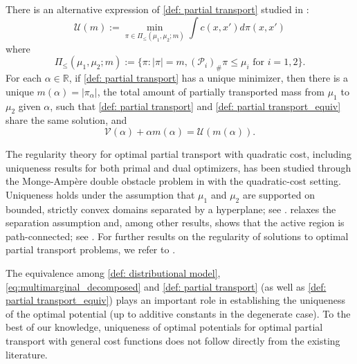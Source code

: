 \documentclass{amsart}
\theoremstyle{plain}
\numberwithin{equation}{section}\newtheorem{theorem}{Theorem}[section]
\theoremstyle{remark}
\begin{document}
There is an alternative expression of \eqref{def: partial transport} studied in \cite{CM2010Annalsmath, Figalli2010ARMA, DynamicPOT2016}:
\begin{equation}\label{def: partial transport_equiv}
    \mathcal{U}(m) :=\min_{\pi\in\Pi_\leq(\mu_1, \mu_2;m)}  \int c(x,x')  d\pi(x,x')
\end{equation}       
where
\[
    \Pi_\leq(\mu_1, \mu_2;m):= \{ \pi : |\pi| = m, (\mathcal{P}_i)_\# \pi \leq \mu_i \text{ for } i=1,2 \}.
\]
For each $\alpha \in \mathbb{R}$, if \eqref{def: partial transport} has a unique minimizer, then there is a unique $m(\alpha)=|\pi_\alpha|$, the total amount of partially transported mass from $\mu_1$ to $\mu_2$ given $\alpha$, such that \eqref{def: partial transport} and \eqref{def: partial transport_equiv} share the same solution, and
\begin{equation}\label{eq: equivalence of partial transport}
    \mathcal{V}(\alpha) + \alpha m(\alpha)= \mathcal{U}(m(\alpha)).
\end{equation}



The regularity theory for optimal partial transport with quadratic cost, including uniqueness results for both primal and dual optimizers, has been studied through the Monge-Ampère double obstacle problem in \cite{CM2010Annalsmath} with the quadratic-cost setting. Uniqueness holds under the assumption that $\mu_1$ and $\mu_2$ are supported on bounded, strictly convex domains separated by a hyperplane; see \cite[Corollary 6.4]{CM2010Annalsmath}. \citet{Figalli2010ARMA} relaxes the separation assumption and, among other results, shows that the active region is path-connected; see \cite[Corollary 4.12]{Figalli2010ARMA}. For further results on the regularity of solutions to optimal partial transport problems, we refer to \cite{FreePOT_Indrei2013, DynamicPOT2016}.



The equivalence among \eqref{def: distributional model}, \eqref{eq:multimarginal_decomposed} and \eqref{def: partial transport} (as well as \eqref{def: partial transport_equiv}) plays an important role in establishing the uniqueness of the optimal potential (up to additive constants in the degenerate case). To the best of our knowledge, uniqueness of optimal potentials for optimal partial transport with general cost functions does not follow directly from the existing literature.
\end{document}
